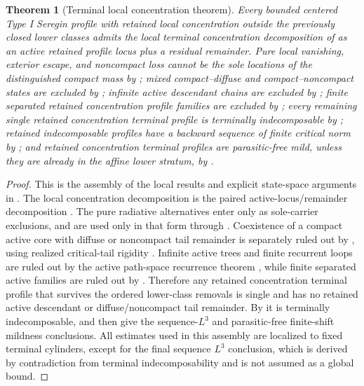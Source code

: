 \documentclass[11pt]{amsart}
\numberwithin{equation}{section}
\theoremstyle{plain}
\newtheorem{theorem}{Theorem}[section]
\theoremstyle{definition}
\theoremstyle{remark}
\begin{document}
\begin{theorem}[Terminal local concentration theorem]
\label{thm:terminal-local-stratification-package}
Every bounded centered Type I Seregin profile with retained local concentration outside the
previously closed lower classes admits the local terminal concentration decomposition of
 as an active retained profile locus plus a
residual remainder.  Pure local vanishing, exterior escape, and noncompact
loss cannot be the sole locations of the distinguished compact mass by
; mixed compact--diffuse and
compact--noncompact states are excluded by
; infinite active descendant chains are
excluded by ; finite separated retained
concentration profile families are excluded by
; every remaining single retained
concentration terminal profile is terminally indecomposable by
; retained indecomposable profiles have a
backward sequence of finite critical norm by ; and
retained concentration terminal profiles are parasitic-free mild, unless they
are already in the affine lower stratum, by
.
\end{theorem}

\begin{proof}
This is the assembly of the local results and explicit state-space arguments in
.  The local
concentration decomposition is the paired active-locus/remainder decomposition
.  The pure radiative alternatives enter
only as sole-carrier exclusions, and are used only in that form through
.  Coexistence of a compact active core
with diffuse or noncompact tail remainder is separately ruled out by
, using realized critical-tail rigidity
.  Infinite active trees and finite
recurrent loops are ruled out by the active path-space recurrence theorem
, while finite separated active families are ruled out by
.  Therefore any retained
concentration terminal profile that survives the ordered lower-class removals is
single and has no retained active descendant or diffuse/noncompact tail
remainder.  By  it is terminally
indecomposable, and then
 give the
sequence-\(L^3\) and parasitic-free finite-shift mildness conclusions.  All estimates used in this assembly
are localized to fixed terminal cylinders, except for the final sequence
\(L^3\) conclusion, which is derived by contradiction from terminal
indecomposability and is not assumed as a global bound.
\end{proof}
\end{document}
